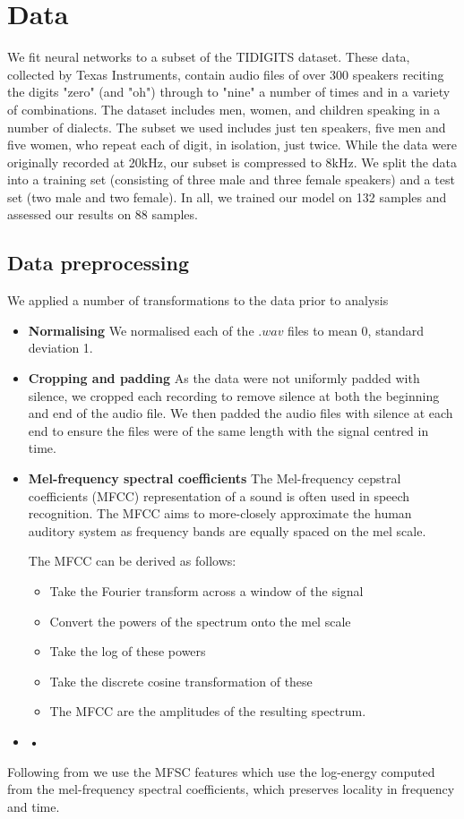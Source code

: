 \section{Data}
We fit neural networks to a subset of the TIDIGITS dataset. These data, collected by Texas Instruments, contain audio files of over 300 speakers reciting the digits "zero" (and "oh") through to "nine" a number of times and in a variety of combinations. The dataset includes men, women, and children speaking in a number of dialects. The subset we used includes just ten speakers, five men and five women, who repeat each of digit, in isolation, just twice. While the data were originally recorded at 20kHz, our subset is compressed to 8kHz.
We split the data into a training set (consisting of three male and three female speakers) and a test set (two male and two female). In all, we trained our model on 132 samples and assessed our results on 88 samples.

 

\subsection{Data preprocessing}
We applied a number of transformations to the data prior to analysis
\begin{itemize}
\item \textbf{Normalising} We normalised each of the $.wav$ files to mean 0, standard deviation 1.

\item \textbf{Cropping and padding} As the data were not uniformly padded with silence, we cropped each recording to remove silence at both the beginning and end of the audio file. We then padded the audio files with silence at each end to ensure the files were of the same length with the signal centred in time.

\item \textbf{Mel-frequency spectral coefficients}
The Mel-frequency cepstral coefficients (MFCC) representation of a sound is often used in speech recognition. The MFCC aims to more-closely approximate the human auditory system as frequency bands are equally spaced on the mel scale. 

The MFCC can be derived as follows:
\begin{itemize}
\item Take the Fourier transform across a window of the signal
\item Convert the powers of the spectrum onto the mel scale
\item Take the log of these powers
\item Take the discrete cosine transformation of these
\item The MFCC are the amplitudes of the resulting spectrum.
\end{itemize}
\item \textbf{•}
\end{itemize}

Following from \cite{abdel2014convolutional} we use the MFSC features which use the log-energy computed from the mel-frequency spectral coefficients, which preserves locality in frequency and time.


